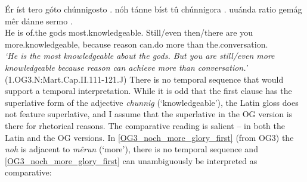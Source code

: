 \documentclass[output=paper,
modfonts
]{langscibook}
\begin{document}
\ea\gll Ér íst tero góto {chúnnigosto .} nóh tánne bíst tû {chúnnigora .} uuánda ratio gemág mêr dánne {sermo .}\\
       He is of.the gods most.knowledgeable. Still/even then/there are you more.knowledgeable, because reason can.do more than the.conversation.\\
\glt   \textit{`He is the most knowledgeable about the gods. But you are still/even more knowledgeable because reason can achieve more than conversation.'}\label{OG3_noch_wissend} \\ \flushright \vspace{-24pt} (1.OG3.N:Mart.Cap.II.111-121.J)
\z
There is no temporal sequence that would support a temporal interpretation. While it is odd that the first clause has the superlative form of the adjective \textit{chunnig} (`knowledgeable'), the Latin gloss does not feature superlative, and I assume that the superlative in the OG version is there for rhetorical reasons. The comparative reading is salient -- in both the Latin and the OG versions. In \ref{OG3_noch_more_glory_first} (from OG3) the \textit{noh} is adjacent to \textit{mêrun} (`more'), there is no temporal sequence and \ref{OG3_noch_more_glory_first} can unambiguously be interpreted as comparative:
\end{document}

